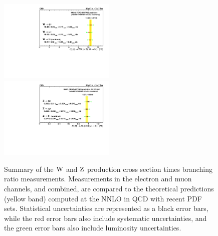 \begin{figure}[htbp]
\begin{center}
  \includegraphics[width=0.495\textwidth]{figs/Results_W.pdf}
  \includegraphics[width=0.495\textwidth]{figs/Results_Z.pdf}
\caption[.]{\label{fig:WZ_LEPstylePlots}
Summary of the $\mathrm{W}$ and $\mathrm{Z}$ production cross section times branching ratio measurements.
Measurements in the electron and muon channels, and combined, are compared to the
theoretical predictions (yellow band) computed at the NNLO in QCD with recent PDF sets.
Statistical uncertainties are represented as a black error bars, while the red error bars also include systematic uncertainties,
and the green error bars also include luminosity uncertainties.
}
\end{center}
\end{figure}



